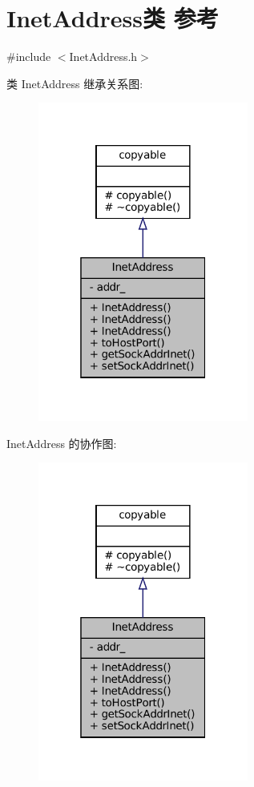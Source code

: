 \hypertarget{classmuduo_1_1InetAddress}{}\section{Inet\+Address类 参考}
\label{classmuduo_1_1InetAddress}


{\ttfamily \#include $<$Inet\+Address.\+h$>$}



类 Inet\+Address 继承关系图\+:
\nopagebreak
\begin{figure}[H]
\begin{center}
\leavevmode
\includegraphics[width=196pt]{classmuduo_1_1InetAddress__inherit__graph}
\end{center}
\end{figure}


Inet\+Address 的协作图\+:
\nopagebreak
\begin{figure}[H]
\begin{center}
\leavevmode
\includegraphics[width=196pt]{classmuduo_1_1InetAddress__coll__graph}
\end{center}
\end{figure}
